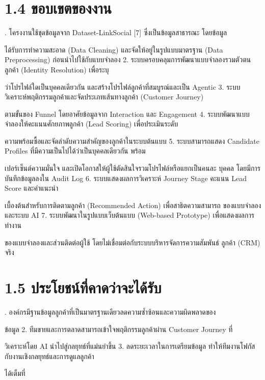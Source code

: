 \documentclass[12pt,a4paper]{report}
\begin{document}
\section*{1.4 ขอบเขตของงาน}
. โครงงานใช้ชุดข้อมูลจาก Dataset-LinkSocial [7] ซึ่งเป็นข้อมูลสาธารณะ โดยข้อมูล\par
ได้รับการทำความสะอาด (Data Cleaning) และจัดให้อยู่ในรูปแบบมาตรฐาน (Data Preprocessing) ก่อนนำไปใช้กับแบบจำลอง 2. ระบบครอบคลุมการพัฒนาแบบจำลองรวมตัวตนลูกค้า (Identity Resolution) เพื่อระบุ\par
ว่าโปรไฟล์ใดเป็นบุคคลเดียวกัน และสร้างโปรไฟล์ลูกค้าที่สมบูรณ์และเป็น Agentic 3. ระบบวิเคราะห์พฤติกรรมลูกค้าและจัดประเภทเส้นทางลูกค้า (Customer Journey)\par
ตามขั้นของ Funnel โดยอาศัยข้อมูลจาก Interaction และ Engagement 4. ระบบพัฒนาแบบจำลองให้คะแนนศักยภาพลูกค้า (Lead Scoring) เพื่อประเมินระดับ\par
ความพร้อมซื้อและจัดลำดับความสำคัญของลูกค้าในระบบต้นแบบ 5. ระบบสามารถแสดง Candidate Profiles ที่มีความเป็นไปได้ว่าเป็นบุคคลเดียวกัน พร้อม\par
เปอร์เซ็นต์ความมั่นใจ และเปิดโอกาสให้ผู้ใช้ตัดสินใจรวมโปรไฟล์หรือแยกเป็นคนละ บุคคล โดยมีการบันทึกข้อมูลลงใน Audit Log 6. ระบบแสดงผลการวิเคราะห์ Journey Stage คะแนน Lead Score และคำแนะนำ\par
เบื้องต้นสำหรับการติดตามลูกค้า (Recommended Action) เพื่อสาธิตความสามารถ ของแบบจำลองและระบบ AI 7. ระบบพัฒนาในรูปแบบเว็บต้นแบบ (Web-based Prototype) เพื่อแสดงผลการทำงาน\par
ของแบบจำลองและส่วนติดต่อผู้ใช้ โดยไม่เชื่อมต่อกับระบบบริหารจัดการความสัมพันธ์ ลูกค้า (CRM) จริง\par
\section*{1.5 ประโยชน์ที่คาดว่าจะได้รับ}
. องค์กรมีฐานข้อมูลลูกค้าที่เป็นมาตรฐานเดียวลดความซ้ำซ้อนและความผิดพลาดของ\par
ข้อมูล 2. ทีมขายและการตลาดสามารถเข้าใจพฤติกรรมลูกค้าผ่าน Customer Journey ที่\par
วิเคราะห์โดย AI นำไปสู่กลยุทธ์ที่แม่นยำขึ้น 3. ลดระยะเวลาในการเตรียมข้อมูล ทำให้ทีมงานโฟกัสกับงานเชิงกลยุทธ์และการดูแลลูกค้า\par
ได้เต็มที่\par
\clearpage
\end{document}
